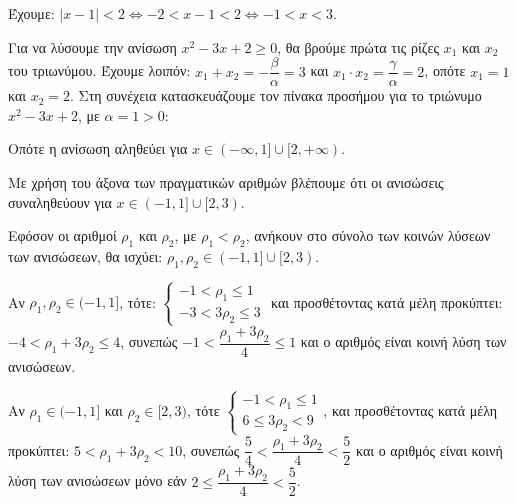 
\begin{alist}
\item Έχουμε: $|x - 1| < 2 \Leftrightarrow -2 < x - 1 < 2 \Leftrightarrow -1 < x < 3$.

Για να λύσουμε την ανίσωση $x^2 - 3x + 2 \ge 0$, θα βρούμε πρώτα τις ρίζες $x_1$ και $x_2$ του τριωνύμου. Έχουμε λοιπόν: $x_1 + x_2 = -\dfrac{\beta}{\alpha} = 3$ και $x_1 \cdot x_2 = \dfrac{\gamma}{\alpha} = 2$, οπότε $x_1 = 1$ και $x_2 = 2$.
Στη συνέχεια κατασκευάζουμε τον πίνακα προσήμου για το τριώνυμο $x^2 - 3x + 2$, με $\alpha = 1 > 0$:
\begin{center}
\end{center}
Οπότε η ανίσωση αληθεύει για $x \in (-\infty, 1] \cup [2, +\infty)$.

\item Με χρήση του άξονα των πραγματικών αριθμών βλέπουμε ότι οι ανισώσεις συναληθεύουν για
$x \in (-1, 1] \cup [2, 3)$.

\item Εφόσον οι αριθμοί $\rho_1$ και $\rho_2$, με $\rho_1 < \rho_2$, ανήκουν στο σύνολο των κοινών λύσεων των ανισώσεων, θα ισχύει: $\rho_1, \rho_2 \in (-1, 1] \cup [2, 3)$.
\begin{rlist}
\item Αν $\rho_1, \rho_2 \in (-1, 1]$, τότε: $\begin{cases} -1 < \rho_1 \le 1 \\ -3 < 3\rho_2 \le 3 \end{cases}$ και προσθέτοντας κατά μέλη προκύπτει:
$-4 < \rho_1 + 3\rho_2 \le 4$, συνεπώς $-1 < \dfrac{\rho_1 + 3\rho_2}{4} \le 1$ και ο αριθμός είναι κοινή λύση των ανισώσεων.
\item Αν $\rho_1 \in (-1, 1]$ και $\rho_2 \in [2, 3)$, τότε $\begin{cases} -1 < \rho_1 \le 1 \\ 6 \le 3\rho_2 < 9 \end{cases}$, και προσθέτοντας κατά μέλη προκύπτει: $5 < \rho_1 + 3\rho_2 < 10$, συνεπώς $\dfrac{5}{4} < \dfrac{\rho_1 + 3\rho_2}{4} < \dfrac{5}{2}$ και ο αριθμός είναι κοινή λύση των ανισώσεων μόνο εάν $2 \le \dfrac{\rho_1 + 3\rho_2}{4} < \dfrac{5}{2}$.
\end{rlist}
\end{alist}

